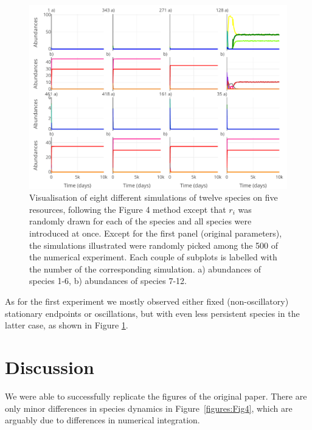 \begin{figure}[H]
\begin{center} 
 \includegraphics[width=1\textwidth]{../Code/Figures/Figure_exp2.pdf}
  \caption{Visualisation of eight different simulations of twelve species on five resources, following the Figure 4 method except that $r_i$ was randomly drawn for each of the species and all species were introduced at once. Except for the first panel (original parameters), the simulations illustrated were randomly picked among the 500 of the numerical experiment. Each couple of subplots is labelled with the number of the corresponding simulation. a) abundances of species 1-6, b) abundances of species 7-12.}
  \label{figures:Figexp2}
\end{center}
\end{figure}

As for the first experiment we mostly observed either fixed (non-oscillatory) stationary endpoints or oscillations, but with even less persistent species in the latter case, as shown in Figure \ref{figures:Figexp2}. %

\section{Discussion}

We were able to successfully replicate the figures of the original paper. There are only minor differences in species dynamics in Figure~\ref{figures:Fig4}, which are arguably due to differences in numerical integration.\\

